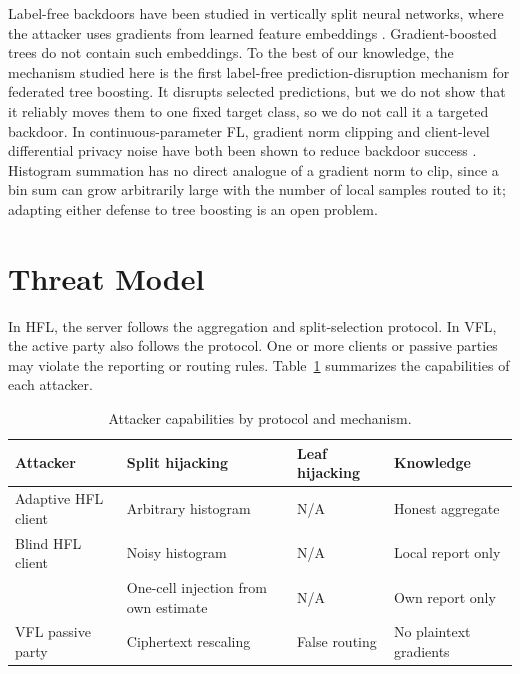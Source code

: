 \documentclass[11pt]{article}
\newcommand{\rev}[1]{{\color{blue}#1}}
\begin{document}
Label-free backdoors have been studied in vertically split neural networks, where the attacker uses gradients from learned feature embeddings \cite{shen2025labelfree}. Gradient-boosted trees do not contain such embeddings. To the best of our knowledge, the \rev{mechanism} studied here is the first label-\rev{free prediction-disruption mechanism} for federated tree boosting. It disrupts selected predictions, but we do not show that it reliably moves them to one fixed target class\rev{, so we do not call it a targeted backdoor}. In continuous-parameter FL, gradient norm clipping and client-level differential privacy noise have both been shown to reduce backdoor success \cite{sun2019backdoor,geyer2017dpfed}. Histogram summation has no direct analogue of a gradient norm to clip, since a bin sum can grow arbitrarily large with the number of local samples routed to it; adapting either defense to tree boosting is an open problem.

\section{Threat Model}
\label{sec:threatmodel}

In HFL, the server follows the aggregation and split-selection protocol. In VFL, the active party also follows the protocol. One or more clients or passive parties may violate the reporting or routing rules. Table~\ref{tab:threatmodel} summarizes the capabilities of each attacker.

\begin{table}[htbp]
\centering
\caption{Attacker capabilities by protocol and mechanism.}
\begin{tabular}{>{\raggedright\arraybackslash}p{3.4cm}>{\raggedright\arraybackslash}p{4.0cm}>{\raggedright\arraybackslash}p{2.1cm}>{\raggedright\arraybackslash}p{3.4cm}}
\toprule
Attacker & Split hijacking & Leaf hijacking & Knowledge \\
\midrule
Adaptive HFL client & Arbitrary histogram & N/A & Honest aggregate \\
Blind HFL client & Noisy histogram & N/A & Local report only \\
\rev{Limited-knowledge HFL client} & \rev{One-cell injection from own estimate} & N/A & \rev{Own report only} \\
VFL passive party & Ciphertext rescaling & False routing & No plaintext gradients \\
\bottomrule
\end{tabular}
\label{tab:threatmodel}
\end{table}
\end{document}
